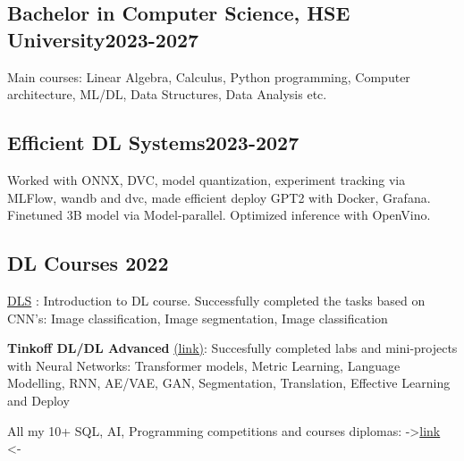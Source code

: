 
\subsection{{Bachelor in Computer Science, HSE University}\hfill 2023-2027}
\vspace*{3pt}
Main courses: Linear Algebra, Calculus, Python programming, Computer architecture, ML/DL, Data Structures, Data Analysis etc.
\vspace*{10pt}


\subsection{{Efficient DL Systems}\hfill 2023-2027}
\vspace*{3pt}
Worked with ONNX, DVC, model quantization, experiment tracking via MLFlow, wandb and dvc, made efficient deploy GPT2 with Docker, Grafana. Finetuned 3B model via Model-parallel. Optimized inference with OpenVino. 

\vspace*{10pt}

\subsection{{DL Courses }\hfill 2022}
\begin{zitemize}
\item \href{https://dls.samcs.ru}{DLS} : Introduction to DL course. Successfully completed the tasks based on CNN's: Image classification, Image segmentation, Image classification
\item \textbf{Tinkoff DL/DL Advanced} \href{https://github.com/Slavikss/tinkoff_DL}{(link)}: Succesfully completed labs and mini-projects with Neural Networks: Transformer models, Metric Learning, Language Modelling, RNN, AE/VAE, GAN, Segmentation, Translation, Effective Learning and Deploy
\item All my 10+ SQL, AI, Programming competitions and courses diplomas: ->\href{https://drive.google.com/drive/folders/1lSdQR9rUAlxo902bfmz6cflQ1azZSL1A?usp=drive_link}{link} <-
\end{zitemize}




